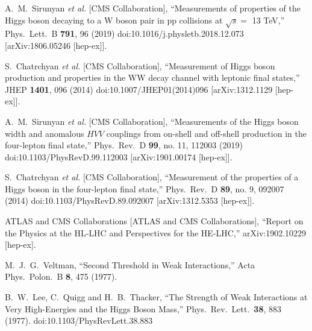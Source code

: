 \begin{thebibliography}{99}
  A.~M.~Sirunyan {\it et al.} [CMS Collaboration],
  ``Measurements of properties of the Higgs boson decaying to a W boson pair in pp collisions at $\sqrt{s}=$ 13 TeV,''
  Phys.\ Lett.\ B {\bf 791}, 96 (2019)
  doi:10.1016/j.physletb.2018.12.073
  [arXiv:1806.05246 [hep-ex]].

  S.~Chatrchyan {\it et al.} [CMS Collaboration],
  ``Measurement of Higgs boson production and properties in the WW decay channel with leptonic final states,''
  JHEP {\bf 1401}, 096 (2014)
  doi:10.1007/JHEP01(2014)096
  [arXiv:1312.1129 [hep-ex]].

  A.~M.~Sirunyan {\it et al.} [CMS Collaboration],
  ``Measurements of the Higgs boson width and anomalous $HVV$ couplings from on-shell and off-shell production in the four-lepton final state,''
  Phys.\ Rev.\ D {\bf 99}, no. 11, 112003 (2019)
  doi:10.1103/PhysRevD.99.112003
  [arXiv:1901.00174 [hep-ex]].

  S.~Chatrchyan {\it et al.} [CMS Collaboration],
  ``Measurement of the properties of a Higgs boson in the four-lepton final state,''
  Phys.\ Rev.\ D {\bf 89}, no. 9, 092007 (2014)
  doi:10.1103/PhysRevD.89.092007
  [arXiv:1312.5353 [hep-ex]].

  ATLAS and CMS Collaborations [ATLAS and CMS Collaborations],
  ``Report on the Physics at the HL-LHC and Perspectives for the HE-LHC,''
  arXiv:1902.10229 [hep-ex].

  M.~J.~G.~Veltman,
  ``Second Threshold in Weak Interactions,''
  Acta Phys.\ Polon.\ B {\bf 8}, 475 (1977).

  B.~W.~Lee, C.~Quigg and H.~B.~Thacker,
  ``The Strength of Weak Interactions at Very High-Energies and the Higgs Boson Mass,''
  Phys.\ Rev.\ Lett.\  {\bf 38}, 883 (1977).
  doi:10.1103/PhysRevLett.38.883


\end{thebibliography}
